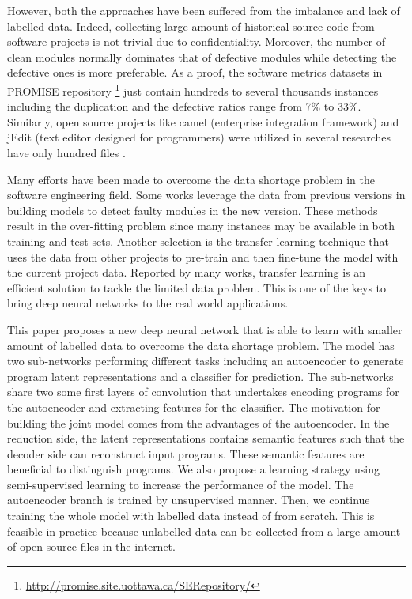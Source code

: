 However, both the approaches have been suffered from the imbalance and lack of labelled data. Indeed, collecting large amount of historical source code from software projects is not trivial due to confidentiality. Moreover, the number of clean modules normally dominates that of defective modules while detecting the defective ones is more preferable. As a proof, the software metrics datasets in PROMISE repository \footnote{\url{http://promise.site.uottawa.ca/SERepository/}} \cite{Sayyad-Shirabad+Menzies:2005} just contain hundreds to several thousands instances including the duplication and the defective ratios range from 7\% to 33\%. Similarly, open source projects like camel (enterprise integration framework) and jEdit (text editor designed for programmers) were utilized in several researches have only hundred files \cite{li2017software}.

Many efforts have been made to overcome the data shortage problem in the software engineering field. Some works leverage the data from previous versions in building models to detect faulty modules in the new version\cite{wu2018cross}. These methods result in the over-fitting problem since many instances may be available in both training and test sets. Another selection is the transfer learning technique that uses the data from other projects to pre-train and then fine-tune the model with the current project data. Reported by many works, transfer learning is an efficient solution to tackle the limited data problem. This is one of the keys to bring deep neural networks to the real world applications.

This paper proposes a new deep neural network that is able to learn with smaller amount of labelled data to overcome the data shortage problem. The model has two sub-networks performing different tasks including an autoencoder to generate program latent representations and a classifier for prediction. The sub-networks share two some first layers of convolution that undertakes encoding programs for the autoencoder and extracting features for the classifier. The motivation for building the joint model comes from the advantages of the autoencoder. In the reduction side, the latent representations contains semantic features such that the decoder side can reconstruct input programs. These semantic features are beneficial to distinguish programs. We also propose a learning strategy using semi-supervised learning to increase the performance of the model. The autoencoder branch is trained by unsupervised manner. Then, we continue training the whole model with labelled data instead of from scratch. This is feasible in practice because unlabelled data can be collected from a large amount of open source files in the internet. 

